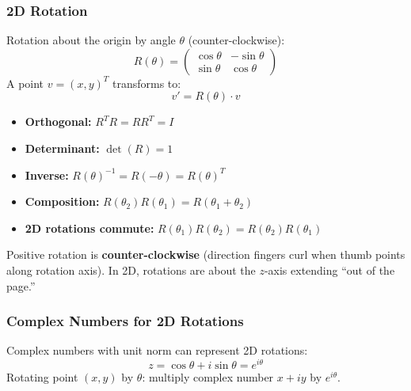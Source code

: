 \separator

\subsubsection{2D Rotation}

\begin{defbox}
Rotation about the origin by angle $\theta$ (counter-clockwise):
\[
R(\theta) = \begin{pmatrix} \cos\theta & -\sin\theta \\ \sin\theta & \cos\theta \end{pmatrix}
\]
A point $v = (x, y)^T$ transforms to:
\[
v' = R(\theta) \cdot v
\]
\end{defbox}

\begin{thmbox}
\begin{itemize}
  \item \textbf{Orthogonal:} $R^T R = R R^T = I$
  \item \textbf{Determinant:} $\det(R) = 1$
  \item \textbf{Inverse:} $R(\theta)^{-1} = R(-\theta) = R(\theta)^T$
  \item \textbf{Composition:} $R(\theta_2) R(\theta_1) = R(\theta_1 + \theta_2)$
  \item \textbf{2D rotations commute:} $R(\theta_1) R(\theta_2) = R(\theta_2) R(\theta_1)$
\end{itemize}
\end{thmbox}

\begin{tipbox}
Positive rotation is \textbf{counter-clockwise} (direction fingers curl when thumb points along rotation axis). In 2D, rotations are about the $z$-axis extending ``out of the page.''
\end{tipbox}

\separator

\subsubsection{Complex Numbers for 2D Rotations}

\begin{defbox}
Complex numbers with unit norm can represent 2D rotations:
\[
z = \cos\theta + i\sin\theta = e^{i\theta}
\]
Rotating point $(x, y)$ by $\theta$: multiply complex number $x + iy$ by $e^{i\theta}$.
\end{defbox}

